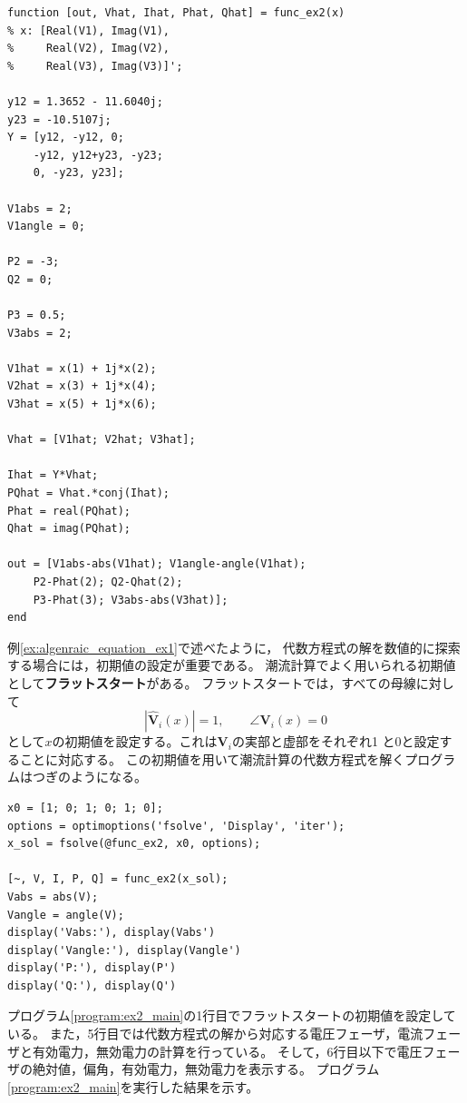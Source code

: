 \documentclass[tombow,dvipdfmx]{corona-a5-1.1}
\begin{document}
\begin{例}[潮流計算の実装法]
\smallskip
\begin{PROGRAMA}[count, title={func\_ex2.m}]\label{program:ex2}
\begin{verbatim}
function [out, Vhat, Ihat, Phat, Qhat] = func_ex2(x)
% x: [Real(V1), Imag(V1),
%     Real(V2), Imag(V2),
%     Real(V3), Imag(V3)]';

y12 = 1.3652 - 11.6040j;
y23 = -10.5107j;
Y = [y12, -y12, 0;
    -y12, y12+y23, -y23;
    0, -y23, y23];

V1abs = 2;
V1angle = 0;

P2 = -3;
Q2 = 0;

P3 = 0.5;
V3abs = 2;

V1hat = x(1) + 1j*x(2);
V2hat = x(3) + 1j*x(4);
V3hat = x(5) + 1j*x(6);

Vhat = [V1hat; V2hat; V3hat];

Ihat = Y*Vhat;
PQhat = Vhat.*conj(Ihat);
Phat = real(PQhat);
Qhat = imag(PQhat);

out = [V1abs-abs(V1hat); V1angle-angle(V1hat);
    P2-Phat(2); Q2-Qhat(2);
    P3-Phat(3); V3abs-abs(V3hat)];
end
\end{verbatim}
\end{PROGRAMA}

例\nobreak\ref{ex:algenraic_equation_ex1}で述べたように，
代数方程式の解を数値的に探索する場合には，初期値の設定が重要である。
潮流計算でよく用いられる初期値として\textbf{フラットスタート}がある。
フラットスタートでは，すべての母線に対して
\[
|\hat{\bm V}_i(x)|=1
,\qquad
\angle \bm V_i(x) = 0
\]
として$x$の初期値を設定する。これは$\bm V_i$の実部と虚部をそれぞれ1
と0と設定することに対応する。
この初期値を用いて潮流計算の代数方程式を解くプログラムはつぎのようになる。

\smallskip
\begin{PROGRAMA}[count,title={main\_ex2.m}]\label{program:ex2_main}
\begin{verbatim}
x0 = [1; 0; 1; 0; 1; 0];
options = optimoptions('fsolve', 'Display', 'iter');
x_sol = fsolve(@func_ex2, x0, options);

[~, V, I, P, Q] = func_ex2(x_sol);
Vabs = abs(V);
Vangle = angle(V);
display('Vabs:'), display(Vabs')
display('Vangle:'), display(Vangle')
display('P:'), display(P')
display('Q:'), display(Q')
\end{verbatim}
\end{PROGRAMA}

プログラム\nobreak\ref{program:ex2_main}の1行目でフラットスタートの初期値を設定している。
また，5行目では代数方程式の解から対応する電圧フェーザ，電流フェーザと有効電力，無効電力の計算を行っている。
そして，6行目以下で電圧フェーザの絶対値，偏角，有効電力，無効電力を表示する。
プログラム\nobreak\ref{program:ex2_main}を実行した結果を示す。


\end{例}
\end{document}
